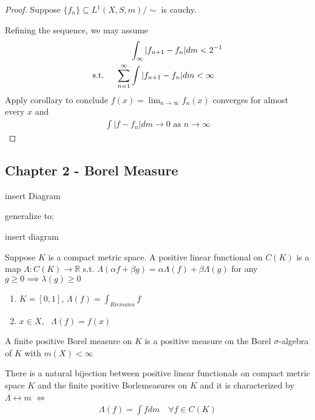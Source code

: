 \begin{proof}
	Suppose $\{f_n\} \subseteq L^{1}(X,S, m) / \sim$ is cauchy.

	Refining the sequence, we may assume 
	\begin{align*}
	&\int_{\infty}|f_{n+1} - f_{n} | dm < 2^{-1} \\ \text{s.t. \quad}
		\sum_{n=1}^{\infty} &\int | f_{n+1} - f_{n} | dm < \infty
	\end{align*} 
	Apply corollary to conclude $f(x) = \lim_{n \to \infty} f_{n}(x)$ converges for almost every $x$ and 
	\begin{align*}
		\int |f - f_{n} | dm \to 0 \text{ as } n \to \infty
	\end{align*} 
\end{proof}


\subsection{Chapter 2 - Borel Measure}

insert Diagram


generalize to:

insert diagram

\begin{definition}
	Suppose $K$ is a compact metric space. A positive linear functional on $C(K)$ is a map $\Lambda : C(K) \to \mathbb{R}$ s.t. 
	$\Lambda(\alpha f + \beta g) = \alpha \Lambda(f) + \beta\Lambda(g)$ for any 
	$g \geq 0 \implies \lambda (g) \geq 0$
\end{definition}

\begin{example}
	\begin{enumerate}
		\item $K = [0,1]$, $\Lambda (f) = \int_{Riemann} f$
		\item $x \in X$, \, $\Lambda(f) = f(x)$
	\end{enumerate}
\end{example}

A finite positive Borel measure on $K$ is a positive measure on the Borel $\sigma$-algebra of $K$ with $m(X) < \infty$

 
\begin{theorem}
	There is a natural bijection between positive linear functionals on compact metric space $K$ and the finite positive Borlemeasures on $K$ and it is characterized by $\Lambda \leftrightarrow m$  
	$\iff$
	 \begin{align*}
	\Lambda(f) = \int f dm \quad \forall f \in C(K)
	\end{align*} 
\end{theorem}

